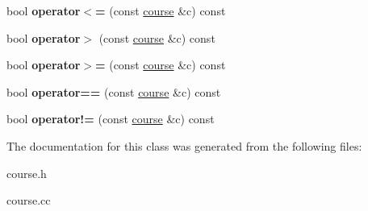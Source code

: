 \begin{DoxyCompactItemize}
\item 
\hypertarget{classcourse_a6416d3083ef57cca7ed77f260f48dc11}{bool {\bfseries operator$<$=} (const \hyperlink{classcourse}{course} \&c) const }\label{classcourse_a6416d3083ef57cca7ed77f260f48dc11}

\item 
\hypertarget{classcourse_a3d4e2681ba4f3ada21b2375129dbdae6}{bool {\bfseries operator$>$} (const \hyperlink{classcourse}{course} \&c) const }\label{classcourse_a3d4e2681ba4f3ada21b2375129dbdae6}

\item 
\hypertarget{classcourse_a3ca9c58c57cb82c195656648ee0dacab}{bool {\bfseries operator$>$=} (const \hyperlink{classcourse}{course} \&c) const }\label{classcourse_a3ca9c58c57cb82c195656648ee0dacab}

\item 
\hypertarget{classcourse_a9902543488788e4d53cd4614ed52ad25}{bool {\bfseries operator==} (const \hyperlink{classcourse}{course} \&c) const }\label{classcourse_a9902543488788e4d53cd4614ed52ad25}

\item 
\hypertarget{classcourse_a7e598f9d46bd8ac668c2f3429f065446}{bool {\bfseries operator!=} (const \hyperlink{classcourse}{course} \&c) const }\label{classcourse_a7e598f9d46bd8ac668c2f3429f065446}

\end{DoxyCompactItemize}


The documentation for this class was generated from the following files\-:\begin{DoxyCompactItemize}
\item 
course.\-h\item 
course.\-cc\end{DoxyCompactItemize}
